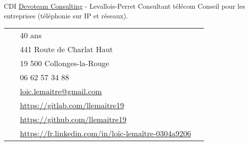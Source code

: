 \documentclass[10pt]{article} %
\begin{document}
\begin{paracol}{2}
  {CDI} %
  {\href{https://devoteam.com/}{Devoteam Consulting} {\small- Levallois-Perret}} %
  {Consultant télécom} %
  {Conseil pour les entreprises (téléphonie sur IP et réseaux).} %


  \vspace{-\baselineskip}\medskip %

  \switchcolumn%


  \parbox[top][0.16\textheight][c]{\linewidth}{ %
    \vspace{-0.04\textheight} %
    \colorbox{shade}{ %
      \begin{supertabular}{p{0.05\linewidth}|p{0.775\linewidth}} %
        \raisebox{0pt}{\faMale} & 40 ans \\ %
        \raisebox{-1pt}{\faHome} & 441 Route de Charlat Haut \\
        & 19 500 Collonges-la-Rouge \\ %
        \raisebox{-1pt}{\faPhone} & 06 62 57 34 88 \\ %
        \raisebox{0pt}{\small\faEnvelope} & \href{mailto:loic.lemaitre@gmail.com}{loic.lemaitre@gmail.com} \\ %
        \raisebox{-1pt}{\small\faGitlab} & \href{https://gitlab.com/llemaitre19}{https://gitlab.com/llemaitre19} \\ %
        \raisebox{-1pt}{\small\faGithub} & \href{https://github.com/llemaitre19}{https://github.com/llemaitre19} \\ %
        \raisebox{-1pt}{\small\faLinkedin} & \href{https://fr.linkedin.com/in/lo\%C3\%AFc-lema\%C3\%AEtre-0304a9206}{https://fr.linkedin.com/in/loïc-lemaître-0304a9206} %
      \end{supertabular}
    }
  }


\end{paracol}
\end{document}

